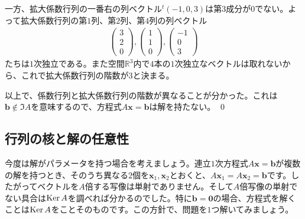 一方、拡大係数行列の一番右の列ベクトル${}^t(-1, 0, 3)$は第$3$成分が$0$でない。よって拡大係数行列の第$1$列、第$2$列、第$4$列の列ベクトル
\begin{align*}
\begin{pmatrix}
3 \\
2 \\
0
\end{pmatrix}, 
\begin{pmatrix}
1 \\
1 \\
0
\end{pmatrix}, 
\begin{pmatrix}
-1 \\
0 \\
3
\end{pmatrix}
\end{align*}
たちは$1$次独立である。また空間$\mathbb{R}^3$内で$4$本の$1$次独立なベクトルは取れないから、これで拡大係数行列の階数が$3$と決まる。

以上で、係数行列と拡大係数行列の階数が異なることが分かった。これは$\bm{b} \not\in \Im A$を意味するので、方程式$A\bm{x} = \bm{b}$は解を持たない。 \qed

\subsection{行列の核と解の任意性}

今度は解がパラメータを持つ場合を考えましょう。連立$1$次方程式$A\bm{x} = \bm{b}$が複数の解を持つとき、そのうち異なる$2$個を$\bm{x}_1, \bm{x}_2$とおくと、$A\bm{x}_1 = A\bm{x}_2 = \bm{b}$です。したがってベクトルを$A$倍する写像は単射でありません。そして$A$倍写像の単射でない具合は$\operatorname{Ker} A$を調べれば分かるのでした。特に$\bm{b} = \bm{0}$の場合、方程式を解くことは$\operatorname{Ker} A$をことそのものです。この方針で、問題を$1$つ解いてみましょう。

